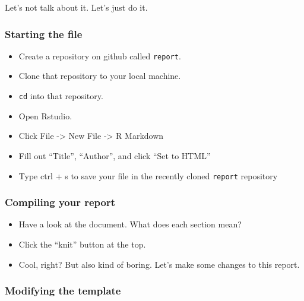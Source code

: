 \documentclass[
]{book}
\providecommand{\tightlist}{%
  \setlength{\itemsep}{0pt}\setlength{\parskip}{0pt}}
\begin{document}
Let's not talk about it. Let's just do it.

\hypertarget{starting-the-file}{%
\subsubsection*{Starting the file}\label{starting-the-file}}

\begin{itemize}
\tightlist
\item
  Create a repository on github called \texttt{report}.\\
\item
  Clone that repository to your local machine.\\
\item
  \texttt{cd} into that repository.\\
\item
  Open Rstudio.\\
\item
  Click File -\textgreater{} New File -\textgreater{} R Markdown\\
\item
  Fill out ``Title'', ``Author'', and click ``Set to HTML''\\
\item
  Type ctrl + s to save your file in the recently cloned \texttt{report} repository
\end{itemize}

\hypertarget{compiling-your-report}{%
\subsubsection*{Compiling your report}\label{compiling-your-report}}

\begin{itemize}
\tightlist
\item
  Have a look at the document. What does each section mean?\\
\item
  Click the ``knit'' button at the top.\\
\item
  Cool, right? But also kind of boring. Let's make some changes to this report.
\end{itemize}

\hypertarget{modifying-the-template}{%
\subsubsection*{Modifying the template}\label{modifying-the-template}}
\end{document}
